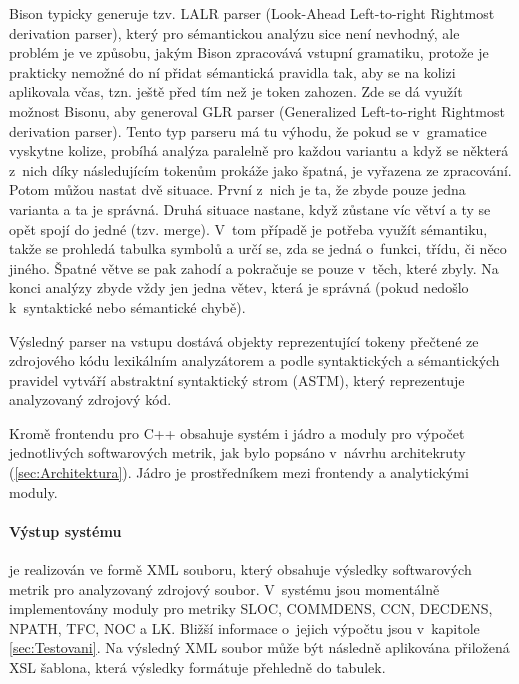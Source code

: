 \documentclass[11pt,twoside,a4paper]{book}
\begin{document}
Bison typicky generuje tzv. LALR parser (Look-Ahead Left-to-right Rightmost derivation parser), který pro sémantickou analýzu sice není nevhodný,
ale problém je ve způsobu, jakým Bison zpracovává vstupní gramatiku, protože je prakticky nemožné do ní přidat sémantická pravidla tak,
aby se na kolizi aplikovala včas, tzn. ještě před tím než je token zahozen. Zde se dá využít možnost Bisonu, aby generoval GLR parser
(Generalized Left-to-right Rightmost derivation parser). Tento typ parseru má tu výhodu, že pokud se v~gramatice vyskytne kolize,
probíhá analýza paralelně pro každou variantu a když se některá z~nich díky následujícím tokenům prokáže jako špatná, je vyřazena ze zpracování.
Potom můžou nastat dvě situace. První z~nich je ta, že zbyde pouze jedna varianta a ta je správná. Druhá situace nastane, když zůstane
víc větví a ty se opět spojí do jedné (tzv. merge). V~tom případě je potřeba využít sémantiku, takže se prohledá tabulka symbolů a určí se,
zda se jedná o~funkci, třídu, či něco jiného. Špatné větve se pak zahodí a pokračuje se pouze v~těch, které zbyly. Na konci analýzy zbyde vždy jen
jedna větev, která je správná (pokud nedošlo k~syntaktické nebo sémantické chybě).

Výsledný parser na vstupu dostává objekty reprezentující tokeny přečtené ze zdrojového kódu lexikálním analyzátorem a podle
syntaktických a sémantických pravidel vytváří abstraktní syntaktický strom (ASTM), který reprezentuje analyzovaný zdrojový kód.

Kromě frontendu pro C++ obsahuje systém i jádro a moduly pro výpočet jednotlivých softwarových metrik, jak bylo popsáno v~návrhu architekruty (\ref{sec:Architektura}).
Jádro je prostředníkem mezi frontendy a analytickými moduly.

\paragraph{Výstup systému} je realizován ve formě XML souboru, který obsahuje výsledky softwarových metrik pro analyzovaný zdrojový soubor.
V~systému jsou momentálně implementovány moduly pro metriky SLOC, COMMDENS, CCN, DECDENS, NPATH, TFC, NOC a LK. Bližší informace
o~jejich výpočtu jsou v~kapitole \ref{sec:Testovani}. Na výsledný XML soubor může být následně aplikována přiložená XSL šablona,
která výsledky formátuje přehledně do tabulek.

\end{document}
